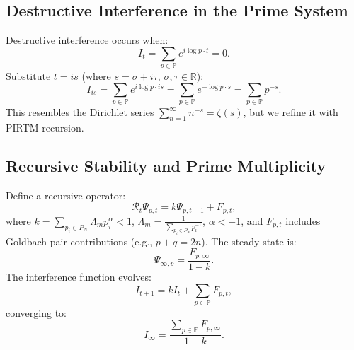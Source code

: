 \documentclass[11pt]{article}
\theoremstyle{plain}
\begin{document}
\subsection{Destructive Interference in the Prime System}
Destructive interference occurs when:
\begin{equation}
    I_t = \sum_{p \in \mathbb{P}} e^{i \log p \cdot t} = 0.
\end{equation}
Substitute \( t = i s \) (where \( s = \sigma + i \tau \), \( \sigma, \tau \in \mathbb{R} \)):
\begin{equation}
    I_{is} = \sum_{p \in \mathbb{P}} e^{i \log p \cdot i s} = \sum_{p \in \mathbb{P}} e^{-\log p \cdot s} = \sum_{p \in \mathbb{P}} p^{-s}.
\end{equation}
This resembles the Dirichlet series \( \sum_{n=1}^\infty n^{-s} = \zeta(s) \), but we refine it with PIRTM recursion.

\subsection{Recursive Stability and Prime Multiplicity}
Define a recursive operator:
\begin{equation}
    \mathcal{R}_t \Psi_{p,t} = k \Psi_{p,t-1} + F_{p,t},
\end{equation}
where \( k = \sum_{p_i \in P_N} \Lambda_m p_i^\alpha < 1 \), \( \Lambda_m = \frac{1}{\sum_{p_i \in P_N} p_i^{-1}} \), \( \alpha < -1 \), and \( F_{p,t} \) includes Goldbach pair contributions (e.g., \( p + q = 2n \)). The steady state is:
\begin{equation}
    \Psi_{\infty,p} = \frac{F_{p,\infty}}{1 - k}.
\end{equation}
The interference function evolves:
\begin{equation}
    I_{t+1} = k I_t + \sum_{p \in \mathbb{P}} F_{p,t},
\end{equation}
converging to:
\begin{equation}
    I_\infty = \frac{\sum_{p \in \mathbb{P}} F_{p,\infty}}{1 - k}.
\end{equation}
\end{document}
